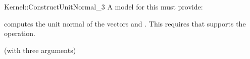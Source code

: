 \begin{ccRefFunctionObjectConcept}{Kernel::ConstructUnitNormal_3}
A model for this must provide:


 {computes the unit normal of the vectors and .
This requires that  supports the  operation.}

\ccRefines
{} (with three arguments)

\ccSeeAlso
{} \\
 \\
\end{ccRefFunctionObjectConcept}
